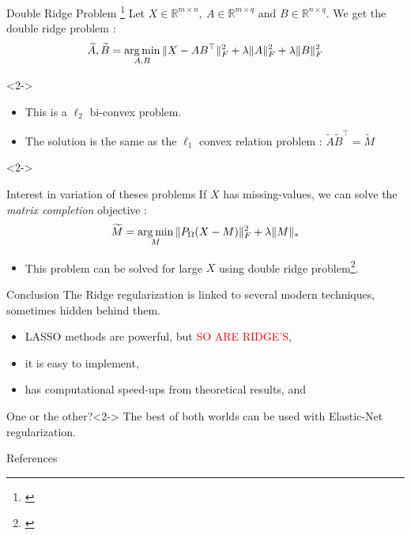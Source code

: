 \documentclass[10pt,aspectratio=43]{beamer}
\begin{document}
\begin{frame}{Double Ridge Problem \footnote[frame]{\citet{srebro2005maximum}}}{}
    Let $X \in \mathbb{R}^{m\times n },~  A \in \mathbb{R}^{m\times q}$ and $B \in \mathbb{R}^{n \times q }$. We get the double ridge problem :
    $$ \widetilde{A}, \widetilde{B} =  \mathop{\mathrm{arg\,min}}_{A, B} \|X-AB^\top \|_F^2 + \lambda \|A \|_F^2 +\lambda \|B \|_F^2 $$
    \begin{onlyenv}<2->
        \begin{itemize}
            \item This is a $\ell_2$ bi-convex problem.
            \item The solution is the same as the $\ell_1$ convex relation problem  :
            $ \widetilde{A} \widetilde{B}^\top = \widetilde{M} $
        \end{itemize}
    \end{onlyenv}
    \begin{onlyenv}<2->
        \begin{block}{Interest in variation of theses  problems}
            If $X$ has missing-values, we can solve the \textit{matrix completion} objective :
            $$\widetilde{M} = \mathop{\mathrm{arg\,min}}_{M} \|P_\Omega (X-M)\|_F^2 + \lambda \|M\|_*$$
        \end{block}
        \begin{itemize}
            \item This problem can be solved for large $X$ using double ridge problem\footnote[frame]{\citet{hastie2015matrix}}.
        \end{itemize}
    \end{onlyenv}
\end{frame}


\begin{frame}{Conclusion}
The Ridge regularization is linked to several modern techniques, sometimes hidden behind them.

\begin{itemize}
    \item LASSO methods are powerful, but \textcolor{red}{SO ARE RIDGE'S},
    \item it is easy to implement,
    \item has computational speed-ups from theoretical results, and
\end{itemize}
\medskip
    \begin{block}{One or the other?}<2->
    The best of both worlds can be used with Elastic-Net regularization.
    \end{block}
\end{frame}



\begin{frame}{References}
    \small
    
\end{frame}
\end{document}
